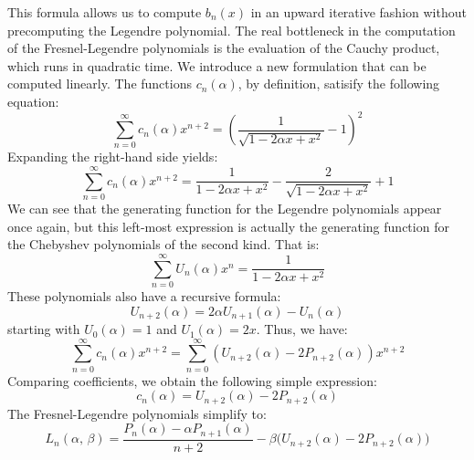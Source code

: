 \documentclass{article}
\theoremstyle{plain}
\begin{document}
        This formula allows us to compute $b_{n}(x)$ in an upward iterative
        fashion without precomputing the Legendre polynomial. The real
        bottleneck in the computation of the Fresnel-Legendre polynomials is
        the evaluation of the Cauchy product, which runs in quadratic time.
        We introduce a new formulation that can be computed linearly. The
        functions $c_{n}(\alpha)$, by definition, satisify the following
        equation:
        \begin{equation}
            \sum_{n=0}^{\infty}c_{n}(\alpha)x^{n+2}
            =\left(
                \frac{1}{\sqrt{1-2\alpha{x}+x^{2}}}-1
            \right)^{2}
        \end{equation}
        Expanding the right-hand side yields:
        \begin{equation}
            \sum_{n=0}^{\infty}c_{n}(\alpha)x^{n+2}
            =\frac{1}{1-2\alpha{x}+x^{2}}
            -\frac{2}{\sqrt{1-2\alpha{x}+x^{2}}}
            +1
        \end{equation}
        We can see that the generating function for the Legendre polynomials
        appear once again, but this left-most expression is actually the
        generating function for the Chebyshev polynomials of the second kind.
        That is:
        \begin{equation}
            \sum_{n=0}^{\infty}U_{n}(\alpha)x^{n}
            =\frac{1}{1-2\alpha{x}+x^{2}}
        \end{equation}
        These polynomials also have a recursive formula:
        \begin{equation}
            U_{n+2}(\alpha)=2\alpha{U}_{n+1}(\alpha)-U_{n}(\alpha)
        \end{equation}
        starting with $U_{0}(\alpha)=1$ and $U_{1}(\alpha)=2x$. Thus, we have:
        \begin{equation}
            \sum_{n=0}^{\infty}c_{n}(\alpha)x^{n+2}
            =\sum_{n=0}^{\infty}\left(
                U_{n+2}(\alpha)-2P_{n+2}(\alpha)
            \right)x^{n+2}
        \end{equation}
        Comparing coefficients, we obtain the following simple expression:
        \begin{equation}
            c_{n}(\alpha)=U_{n+2}(\alpha)-2P_{n+2}(\alpha)
        \end{equation}
        The Fresnel-Legendre polynomials simplify to:
        \begin{equation}
            L_{n}(\alpha,\,\beta)
            =\frac{P_{n}(\alpha)-\alpha{P}_{n+1}(\alpha)}{n+2}
                -\beta\big(U_{n+2}(\alpha)-2P_{n+2}(\alpha)\big)
        \end{equation}
\end{document}

